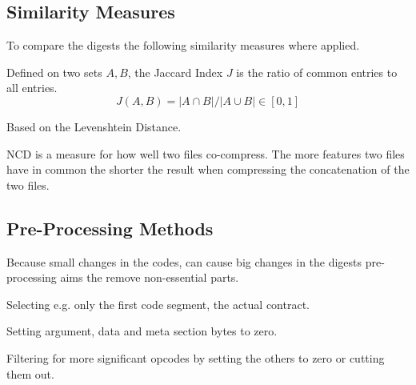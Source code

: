 \documentclass[../main.tex]{subfiles}
\begin{document}
\subsection{Similarity Measures}
To compare the digests the following similarity measures where applied.

\begin{description}[style=unboxed]
  \item[Jaccard Index]
    Defined on two sets \(A, B\), the Jaccard Index \(J\) is the ratio of common entries to all entries.
    \begin{equation}
      J(A,B) = |A \cap B| / |A \cup B| \in [0,1]
      \label{eq:jaccard}
    \end{equation}

  \item[Levenshtein similarity]
    Based on the Levenshtein Distance.

  \item[Normalized Compression Distance (NCD)]
    NCD is a measure for how well two files co-compress. The more features two files have in common the shorter the result when compressing the concatenation of the two files.
\end{description}

\subsection{Pre-Processing Methods}
Because small changes in the codes, can cause big changes in the digests pre-processing aims the remove non-essential parts.

\begin{description}[style=unboxed]
  \item[Segment selection]
    Selecting e.g. only the first code segment, the actual contract.

  \item[Skeletonization]
    Setting argument, data and meta section bytes to zero.

  \item[Opcode filteringn]
    Filtering for more significant opcodes by setting the others to zero or cutting them out.
\end{description}
\end{document}
